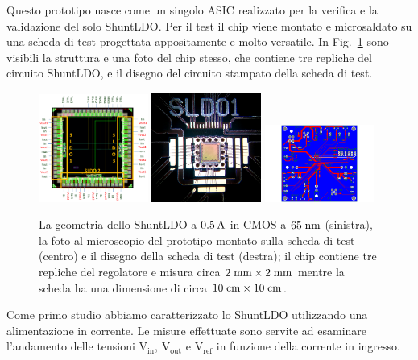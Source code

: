 Questo prototipo nasce come un singolo ASIC realizzato per la verifica e la validazione del solo ShuntLDO. Per il test il chip viene montato e microsaldato su una scheda di test progettata appositamente e molto versatile. In Fig.~\ref{PCB05A} sono visibili la struttura e una foto del chip stesso, che contiene tre repliche del circuito ShuntLDO, e il disegno del circuito stampato della scheda di test.
\begin{figure}
\centering
\includegraphics[width=0.32\textwidth]{Immagini/chipSLDO05A.png}
\hfill
\includegraphics[width=0.32\textwidth]{Immagini/chip05_foto.png}
\hfill
\includegraphics[width=0.32\textwidth]{Immagini/pcb05.pdf}
\caption{La geometria dello ShuntLDO a $0.5\rm \, A$ in CMOS a $65\rm \; nm$ (sinistra), la foto al microscopio del prototipo montato sulla scheda di test (centro) e il disegno della scheda di test (destra); il chip contiene tre repliche del regolatore e misura circa $2\rm \; mm\times 2\rm \; mm$ mentre la scheda ha una dimensione di circa $10\rm \; cm \times 10\rm \; cm$.}
\label{PCB05A}
\end{figure}
Come primo studio abbiamo caratterizzato lo ShuntLDO utilizzando una alimentazione in corrente. Le misure effettuate sono servite ad esaminare l'andamento delle tensioni $\mathrm{V_{in}}$, $\mathrm{V_{out}}$ e $\mathrm{V_{ref}}$ in funzione della corrente in ingresso.

